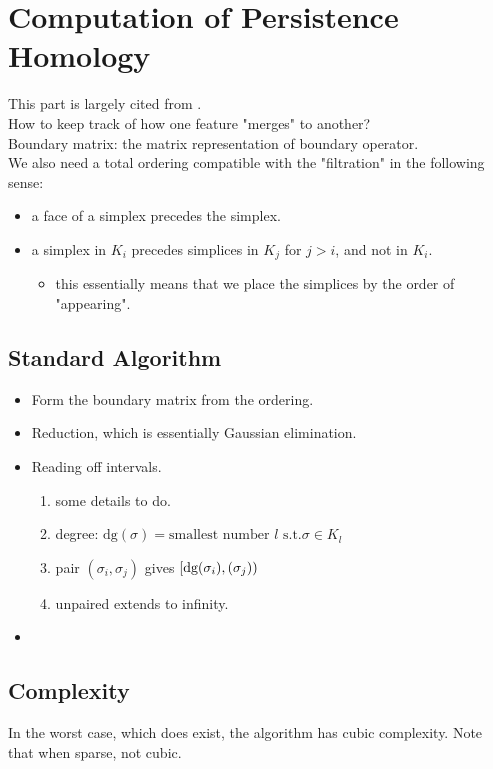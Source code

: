 \documentclass[10pt,a4paper]{article}
\begin{document}
\section{Computation of Persistence Homology}
This part is largely cited from \cite{Otter2017}.\\
How to keep track of how one feature "merges" to another?\\
Boundary matrix: the matrix representation of boundary operator.\\
We also need a total ordering compatible with the "filtration" in the following sense:
\begin{itemize}
	\item a face of a simplex precedes the simplex.
	\item a simplex in $K_i$ precedes simplices in $K_j$ for $j>i$, and not in $K_i$.
	\begin{itemize}
		\item this essentially means that we place the simplices by the order of "appearing".
	\end{itemize}
\end{itemize}

\subsection{Standard Algorithm}
\begin{itemize}
	\item Form the boundary matrix from the ordering.
	\item Reduction, which is essentially Gaussian elimination.
	\item Reading off intervals.
	\begin{enumerate}
		\item some details to do.
		\item degree: $\text{dg}(\sigma)=\text{smallest number }l\text{ s.t.}\sigma\in K_l$
		\item pair $(\sigma_i,\sigma_j)$ gives $[\text{dg}(\sigma_i),\text(\sigma_j))$
		\item unpaired extends to infinity.
	\end{enumerate}
	\item 
\end{itemize}

\subsection{Complexity}
In the worst case, which does exist, the algorithm has cubic complexity. Note that when sparse, not cubic.
\end{document}
